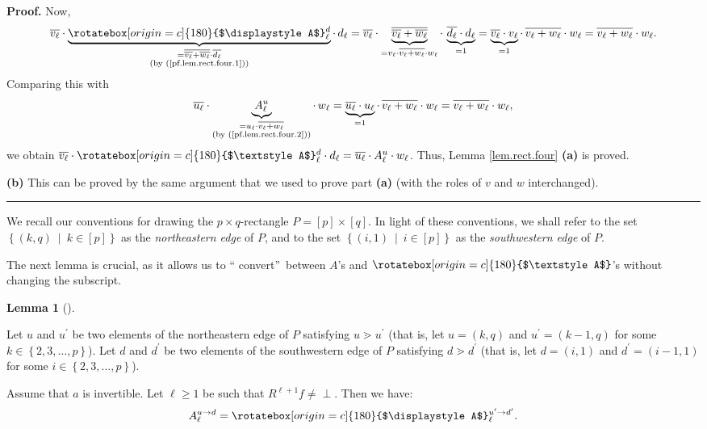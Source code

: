 \documentclass[numbers=enddot,12pt,final,onecolumn,notitlepage]{scrartcl}%
\theoremstyle{definition}
\newtheorem{lem}[theo]{Lemma}
\newenvironment{lemma}[1][]
{\begin{lem}[#1]\begin{leftbar}}
{\end{leftbar}\end{lem}}
\newcommand{\undf}{\operatorname*{\bot}}
\newcommand{\upslack}{\mathchoice{\rotatebox[origin=c]{180}{$\displaystyle A$}}{\rotatebox[origin=c]{180}{$\textstyle A$}}{\rotatebox[origin=c]{180}{$\scriptstyle A$}}{\rotatebox[origin=c]{180}{$\scriptscriptstyle A$}}}
\newcommand{\downslack}{A}
\newenvironment{proof}[1][Proof]{\noindent\textbf{#1.} }{\ \rule{0.5em}{0.5em}}
\begin{document}
\begin{proof}
Now,%
\[
\overline{v_{\ell}}\cdot\underbrace{\upslack_{\ell}^{d}}_{\substack{=\overline
{\overline{v_{\ell}}+\overline{w_{\ell}}}\cdot\overline{d_{\ell}}\\\text{(by
(\ref{pf.lem.rect.four.1}))}}}\cdot\,d_{\ell}=\overline{v_{\ell}}%
\cdot\underbrace{\overline{\overline{v_{\ell}}+\overline{w_{\ell}}}}%
_{=v_{\ell}\cdot\overline{v_{\ell}+w_{\ell}}\cdot w_{\ell}}\cdot
\,\underbrace{\overline{d_{\ell}}\cdot d_{\ell}}_{=1}=\underbrace{\overline
{v_{\ell}}\cdot v_{\ell}}_{=1}\cdot\,\overline{v_{\ell}+w_{\ell}}\cdot
w_{\ell}=\overline{v_{\ell}+w_{\ell}}\cdot w_{\ell}.
\]
Comparing this with%
\[
\overline{u_{\ell}}\cdot\underbrace{\downslack_{\ell}^{u}}_{\substack{=u_{\ell
}\cdot\overline{v_{\ell}+w_{\ell}}\\\text{(by (\ref{pf.lem.rect.four.2}))}%
}}\cdot\,w_{\ell}=\underbrace{\overline{u_{\ell}}\cdot u_{\ell}}_{=1}%
\cdot\,\overline{v_{\ell}+w_{\ell}}\cdot w_{\ell}=\overline{v_{\ell}+w_{\ell}%
}\cdot w_{\ell},
\]
we obtain $\overline{v_{\ell}}\cdot\upslack_{\ell}^{d}\cdot d_{\ell}%
=\overline{u_{\ell}}\cdot\downslack_{\ell}^{u}\cdot w_{\ell}$. Thus, Lemma
\ref{lem.rect.four} \textbf{(a)} is proved. \medskip

\textbf{(b)} This can be proved by the same argument that we used to prove
part \textbf{(a)} (with the roles of $v$ and $w$ interchanged).
\end{proof}

We recall our conventions for drawing the $p\times q$-rectangle $P=\left[
p\right]  \times\left[  q\right]  $. In light of these conventions, we shall
refer to the set $\left\{  \left(  k,q\right)  \ \mid\ k\in\left[  p\right]
\right\}  $ as the \emph{northeastern edge} of $P$, and to the set $\left\{
\left(  i,1\right)  \ \mid\ i\in\left[  p\right]  \right\}  $ as the
\emph{southwestern edge} of $P$.

The next lemma is crucial, as it allows us to \textquotedblleft
convert\textquotedblright\ between $\downslack$'s and $\upslack$'s without
changing the subscript.

\begin{lemma}
[Conversion lemma]\label{lem.rect.conv}Let $u$ and $u^{\prime}$ be two
elements of the northeastern edge of $P$ satisfying $u\gtrdot u^{\prime}$
(that is, let $u=\left(  k,q\right)  $ and $u^{\prime}=\left(  k-1,q\right)  $
for some $k\in\left\{  2,3,\ldots,p\right\}  $). Let $d$ and $d^{\prime}$ be
two elements of the southwestern edge of $P$ satisfying $d\gtrdot d^{\prime}$
(that is, let $d=\left(  i,1\right)  $ and $d^{\prime}=\left(  i-1,1\right)  $
for some $i\in\left\{  2,3,\ldots,p\right\}  $).

Assume that $a$ is invertible. Let $\ell\geq1$ be such that $R^{\ell+1}%
f\neq\undf$. Then we have:
\[
\downslack_{\ell}^{u\rightarrow d}=\upslack_{\ell}^{u^{\prime}\rightarrow
d^{\prime}}.
\]

\end{lemma}
\end{document}

